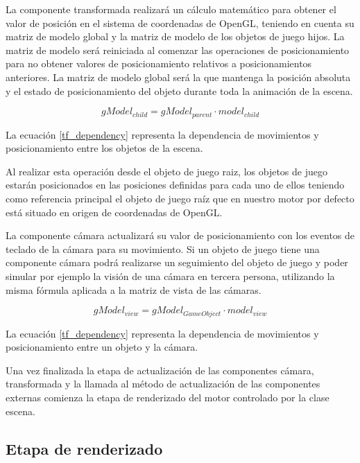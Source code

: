 \documentclass[a4paper, 17pt]{book}
\begin{document}
La componente transformada realizará un cálculo matemático para obtener el valor de posición en el sistema de coordenadas de OpenGL,
teniendo en cuenta su matriz de modelo global y la matriz de modelo de los objetos de juego hijos. La matriz de modelo será reiniciada
al comenzar las operaciones de posicionamiento para no obtener valores de posicionamiento relativos a posicionamientos anteriores.
La matriz de modelo global será la que mantenga la posición absoluta y el estado de posicionamiento del objeto durante toda la
animación de la escena.

\begin{equation} \label{tf_dependency}
gModel_{child} = gModel_{parent} \cdot model_{child}
\end{equation}

La ecuación \ref{tf_dependency} representa la dependencia de movimientos y posicionamiento entre los objetos de la escena.

Al realizar esta operación desde el objeto de juego raiz, los objetos de juego estarán posicionados en las posiciones definidas para
cada uno de ellos teniendo como referencia principal el objeto de juego raíz que en nuestro motor por defecto está situado en origen
de coordenadas de OpenGL.

La componente cámara actualizará su valor de posicionamiento con los eventos de teclado de la cámara para su movimiento. Si un objeto
de juego tiene una componente cámara podrá realizarse un seguimiento del objeto de juego y poder simular por ejemplo la visión de una
cámara en tercera persona, utilizando la misma fórmula aplicada a la matriz de vista de las cámaras.

\begin{equation} \label{tf_dependency}
gModel_{view} = gModel_{GameObject} \cdot model_{view}
\end{equation}

La ecuación \ref{tf_dependency} representa la dependencia de movimientos y posicionamiento entre un objeto y la cámara.

Una vez finalizada la etapa de actualización de las componentes cámara, transformada y la llamada al método de actualización
de las componentes externas comienza la etapa de renderizado del motor controlado por la clase escena.

\subsection{Etapa de renderizado}
\label{subsec:renderizado}
\end{document}
